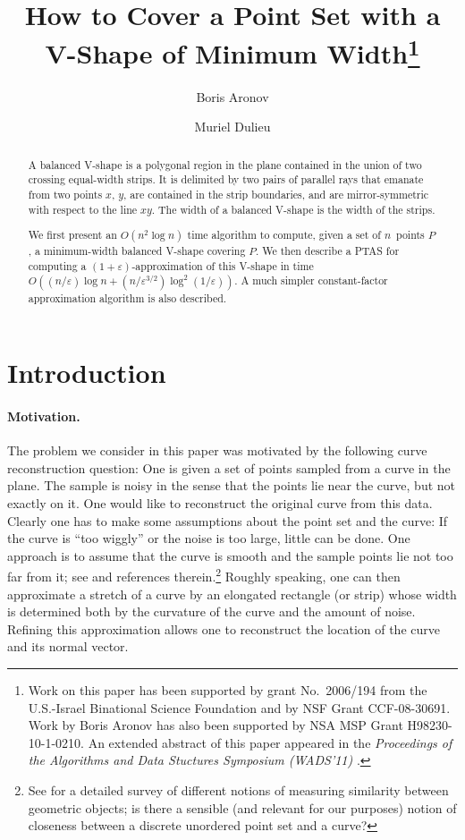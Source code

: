 \documentclass{llncs}
\title{How to Cover a Point Set with a V-Shape of Minimum Width\thanks{Work on this paper has been supported by grant No.~2006/194
    from the U.S.-Israel Binational Science Foundation and by NSF
    Grant CCF-08-30691.  Work by Boris Aronov has also been supported
    by NSA MSP Grant H98230-10-1-0210.  An extended abstract of this
    paper appeared in the \emph{Proceedings of the Algorithms and Data
      Stuctures Symposium (WADS'11)} \cite{AD11}.}}
\author{Boris Aronov \and Muriel Dulieu}
\institute{Department of Computer Science and Engineering, Polytechnic 
 Institute of NYU, Brooklyn, NY~11201-3840, USA;
 \email{aronov@poly.edu}, \email{mdulieu@gmail.com}}
\let\eps\varepsilon
\begin{document}
\maketitle
\pagestyle{plain}
\thispagestyle{plain}
\begin{abstract}
  A balanced V-shape is a polygonal region in the plane contained in
  the union of two crossing equal-width strips.  
  It is delimited by two pairs of parallel rays that emanate from two points
  $x$, $y$, are contained in the strip boundaries, and are mirror-symmetric with respect to the line $xy$.
   The width of a balanced V-shape is the width of the strips.
   
  We first present an $O(n^2 \log n)$ time algorithm to compute, given
  a set of $n$~points $P$, a minimum-width balanced V-shape covering
  $P$.
We then describe a PTAS for computing a $(1+\eps)$-approximation of
  this V-shape in time $O((n/\eps)\log n +
  (n/\eps^{3/2})\log^2(1/\eps))$.
  A much simpler constant-factor approximation algorithm is also described.
\end{abstract}


\section{Introduction}
\label{sec:introduction}

\paragraph*{Motivation.}
The problem we consider in this paper was motivated by the following
curve reconstruction question: One is given a set of points sampled
from a curve in the plane.  The sample is noisy in the sense that
the points lie near the curve, but not exactly on it.  One would like to
reconstruct the original curve from this data.  Clearly one has to
make some assumptions about the point set and the curve: If the curve is
``too wiggly'' or the noise is too large, little can be done.  One
approach is to assume that the curve is smooth and the sample points
lie not too far from it; see \cite{curve-noisy,curve-dey} and
references therein.\footnote{See \cite{alt-guibas-survey} for a detailed survey of different
  notions of measuring similarity between geometric objects;
  is there a sensible (and relevant for our purposes) notion of
  closeness between a discrete unordered point set and a curve?}
Roughly speaking, one can then approximate a stretch of a curve by an
elongated rectangle (or strip) whose width is determined both by the
curvature of the curve and the amount of noise.  Refining this
approximation allows one to reconstruct the location of the curve and
its normal vector.
\end{document}
